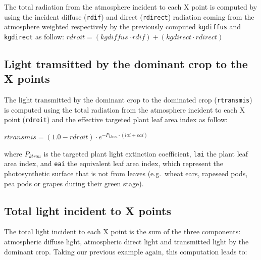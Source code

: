 \documentclass[]{book}
\theoremstyle{definition}
\theoremstyle{definition}
\theoremstyle{definition}
\theoremstyle{remark}
\begin{document}
The total radiation from the atmosphere incident to each X point is
computed by using the incident diffuse (\texttt{rdif}) and direct
(\texttt{rdirect}) radiation coming from the atmosphere weighted
respectively by the previously computed \texttt{kgdiffus} and
\texttt{kgdirect} as follow:
\(rdroit=(kgdiffus\cdot rdif)+(kgdirect\cdot rdirect)\)

\subsection{Light tramsitted by the dominant crop to the X
points}\label{light-tramsitted-by-the-dominant-crop-to-the-x-points}

The light transmitted by the dominant crop to the dominated crop
(\texttt{rtransmis}) is computed using the total radiation from the
atmosphere incident to each X point (\texttt{rdroit}) and the effective
targeted plant leaf area index as follow:

\(rtransmis=(1.0-rdroit)\cdot e^{-P_{ktrou}\cdot(lai+eai)}\)

where \(P_{ktrou}\) is the targeted plant light extinction coefficient,
\texttt{lai} the plant leaf area index, and \texttt{eai} the equivalent
leaf area index, which represent the photosynthetic surface that is not
from leaves (e.g.~wheat ears, rapeseed pods, pea pods or grapes during
their green stage).

\subsection{Total light incident to X
points}\label{total-light-incident-to-x-points}

The total light incident to each X point is the sum of the three
components: atmospheric diffuse light, atmospheric direct light and
transmitted light by the dominant crop. Taking our previous example
again, this computation leads to:
\end{document}
